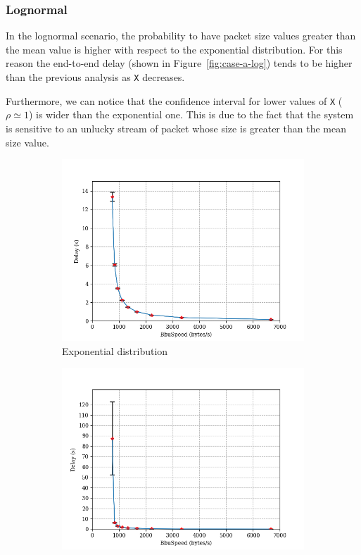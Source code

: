 \documentclass[11pt,a4paper,oneside, openright]{article}
\begin{document}
\subsubsection{Lognormal}
In the lognormal scenario, the probability to have packet size values greater than the mean value is higher with respect to the exponential distribution. For this reason the end-to-end delay (shown in Figure~\ref{fig:case-a-log}) tends to be higher than the previous analysis as \texttt{X} decreases.

Furthermore, we can notice that the confidence interval for lower values of \texttt{X} ($\rho \simeq 1$) is wider than the exponential one. This is due to the fact that the system is sensitive to an unlucky stream of packet whose size is greater than the mean size value.


\begin{figure}
\centering
\begin{subfigure}{.5\textwidth}
  \centering
  \includegraphics[width=\linewidth]{images/case-a-exp}
  \caption{Exponential distribution}
  \label{fig:case-a-exp}
\end{subfigure}%
\begin{subfigure}{.5\textwidth}
  \centering
  \includegraphics[width=\linewidth]{images/case-a-logn}

\end{subfigure}
\end{figure}
\end{document}
